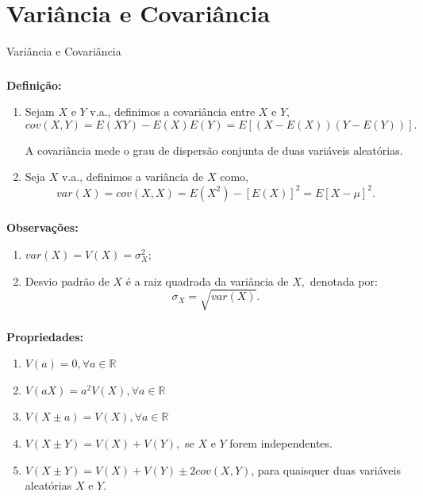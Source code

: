 \documentclass[14pt,aspectratio=1610]{beamer}
\begin{document}
\section{Variância e Covariância}
\begin{frame}{Variância e Covariância}
\frametitle{}
\begin{block}{}
\justifying
\textbf{Definição:} 
\begin{enumerate}
\item Sejam $X$ e $Y$ v.a., definimos a covariância entre $X$ e $Y,$ $$cov(X,Y)=E(XY)-E(X)E(Y)=E[(X-E(X))(Y-E(Y))].$$

A covariância mede o grau de dispersão conjunta de duas variáveis aleatórias.\pause

\item Seja $X$ v.a., definimos a variância de $X$ como, $$var(X)=cov(X,X)=E(X^{2})-[E(X)]^{2}=E[X-\mu]^{2}.$$

\end{enumerate}

\end{block}
\end{frame}

\begin{frame}{}
\frametitle{}
\begin{block}{}
\justifying
\textbf{Observações:} 
\begin{enumerate}
\item $var(X)=V(X)=\sigma_{X}^{2};$\pause

\item Desvio padrão de $X$ é a raiz quadrada da variância de $X,$ denotada por: $$\sigma_{X}=\sqrt{var(X)}.$$

\end{enumerate}

\end{block}
\end{frame}

\begin{frame}{}
\frametitle{}
\begin{block}{}
\justifying
\textbf{Propriedades:}

\begin{enumerate}
\item $V(a)=0,\forall a\in \mathbb{R}$\pause
\item $V(aX)=a^{2}V(X),\forall a\in \mathbb{R}$\pause
\item $V(X\pm a)=V(X), \forall a\in \mathbb{R}$\pause
\item $V(X\pm Y)=V(X) + V(Y),$ se $X$ e $Y$ forem independentes.\pause
\item $V(X\pm Y)=V(X) + V(Y) \pm 2cov(X,Y)$, para quaisquer duas variáveis aleatórias $X$ e $Y.$
\end{enumerate}
\end{block}
\end{frame}
\end{document}
